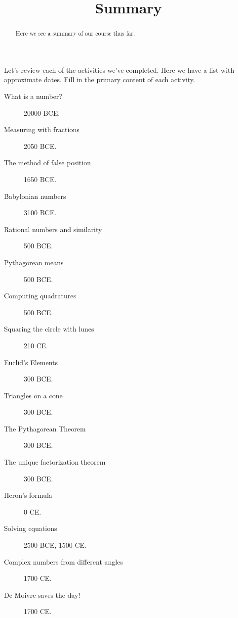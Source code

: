 \documentclass{ximera}
\title{Summary}
\begin{document}
\begin{abstract}
Here we see a summary of our course thus far. 
\end{abstract}
\maketitle

Let's review each of the activities we've completed. Here we have a
list with approximate dates. Fill in the primary content of each
activity.

\begin{description}
\item[What is a number?] 20000 BCE.
\vspace{1in}\item[Measuring with fractions] 2050 BCE.
\vspace{1in}\item[The method of false position] 1650 BCE.
\vspace{1in}\item[Babylonian numbers] 3100 BCE.
\vspace{1in}\item[Rational numbers and similarity] 500 BCE.
\vspace{1in}\item[Pythagorean means] 500 BCE.
\vspace{1in}\item[Computing quadratures] 500 BCE.
\vspace{1in}\item[Squaring the circle with lunes] 210 CE.
\vspace{1in}\item[Euclid's Elements] 300 BCE.
\vspace{1in}\item[Triangles on a cone] 300 BCE.
\vspace{1in}\item[The Pythagorean Theorem] 300 BCE.
\vspace{1in}\item[The unique factorization theorem] 300 BCE.
\vspace{1in}\item[Heron's formula] 0 CE.
\vspace{1in}\item[Solving equations] 2500 BCE, 1500 CE.
\vspace{1in}\item[Complex numbers from different angles] 1700 CE.
\vspace{1in}\item[De Moivre saves the day!] 1700 CE.

\end{description}
\end{document}
